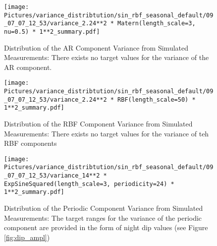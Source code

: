\begin{figure}[h!]
    \centering
    \texttt{[image: 
       Pictures/variance\_distribtution/sin\_rbf\_seasonal\_default/09\_07\_07\_12\_53/variance\_2.24**2 * Matern(length\_scale=3, nu=0.5) * 1**2\_summary.pdf]}
    \caption[Distribution of the AR Component Variance from Simulated Measurements]{
    Distribution of the AR Component Variance from Simulated Measurements:
    There exists no target values for the variance of the AR component.}
    \label{fig:var_matern}
\end{figure}

\begin{figure}[h!]
    \centering
    \texttt{[image: 
       Pictures/variance\_distribtution/sin\_rbf\_seasonal\_default/09\_07\_07\_12\_53/variance\_2.24**2 * RBF(length\_scale=50) * 1**2\_summary.pdf]}
    \caption[Distribution of the RBF Component Variance from Simulated Measurements]{
        Distribution of the RBF Component Variance from Simulated Measurements:
        There exists no target values for the variance of teh RBF components}
    \label{fig:var_rbf}
\end{figure}


\begin{figure}[h!]
    \centering
    \texttt{[image: 
       Pictures/variance\_distribtution/sin\_rbf\_seasonal\_default/09\_07\_07\_12\_53/variance\_14**2 * ExpSineSquared(length\_scale=3, periodicity=24) * 1**2\_summary.pdf]}
    \caption[Distribution of the Periodic Component Variance from Simulated Measurements]{
        Distribution of the Periodic Component Variance from Simulated Measurements:
        The target ranges for the variance of the periodic component are provided in the form of night dip values (see Figure \ref{fig:dip_ampl})}
    \label{fig:var_periodc}
\end{figure}



